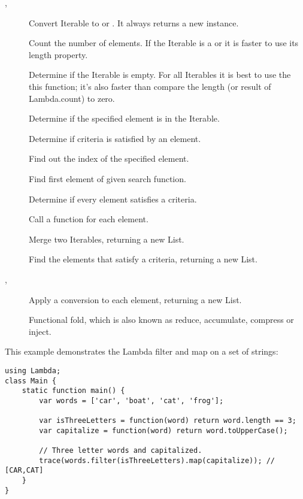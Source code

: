 \begin{description}
	\item[, ] Convert Iterable to  or . It always returns a new instance.
	\item[] Count the number of elements.  If the Iterable is a  or  it is faster to use its length property.
	\item[] Determine if the Iterable is empty. For all Iterables it is best to use the this function; it's also faster than compare the length (or result of Lambda.count) to zero.
	\item[] Determine if the specified element is in the Iterable.
	\item[] Determine if criteria is satisfied by an element.
	\item[] Find out the index of the specified element.
	\item[] Find first element of given search function.
	\item[] Determine if every element satisfies a criteria.
	\item[] Call a function for each element.
	\item[] Merge two Iterables, returning a new List.
	\item[] Find the elements that satisfy a criteria, returning a new List.
	\item[, ] Apply a conversion to each element, returning a new List.
	\item[] Functional fold, which is also known as reduce, accumulate, compress or inject.
\end{description}

This example demonstrates the Lambda filter and map on a set of strings:

\begin{lstlisting}
using Lambda;
class Main {
    static function main() {
        var words = ['car', 'boat', 'cat', 'frog'];

		var isThreeLetters = function(word) return word.length == 3;
		var capitalize = function(word) return word.toUpperCase();
		
		// Three letter words and capitalized. 
		trace(words.filter(isThreeLetters).map(capitalize)); // [CAR,CAT]
    }
}
\end{lstlisting} 

